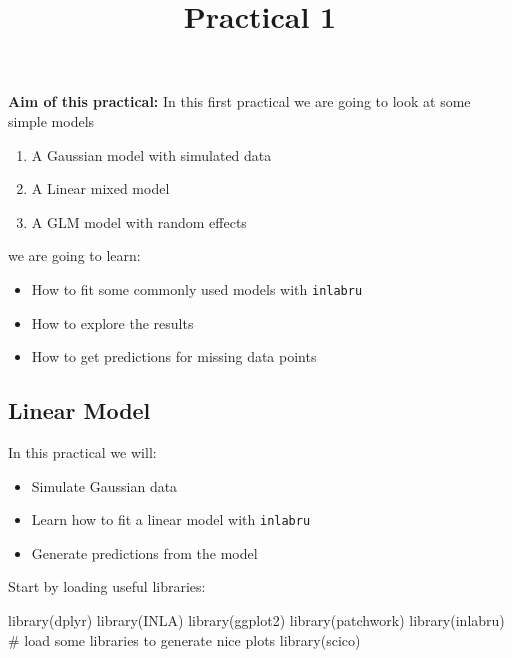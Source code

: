 \documentclass[
  letterpaper,
  DIV=11,
  numbers=noendperiod]{scrartcl}
\title{Practical 1}
\author{}
\date{}
\makeatletter
\newenvironment{Shaded}{\begin{snugshade}}{\end{snugshade}}
\newcommand{\CommentTok}[1]{\textcolor[rgb]{0.37,0.37,0.37}{#1}}
\newcommand{\FunctionTok}[1]{\textcolor[rgb]{0.28,0.35,0.67}{#1}}
\newcommand{\NormalTok}[1]{\textcolor[rgb]{0.00,0.23,0.31}{#1}}
\providecommand{\tightlist}{%
  \setlength{\itemsep}{0pt}\setlength{\parskip}{0pt}}\usepackage{longtable,booktabs,array}
\renewcommand{\maketitle}{\bgroup\setlength{\parindent}{0pt}
\begin{flushleft}
  {\sffamily\huge\textbf{\MakeUppercase{\@title}}} \vspace{0.3cm} \newline
  {\Large {\@subtitle}} \newline
  \@author
\end{flushleft}\egroup
}
\makeatother
\begin{document}
\maketitle

\pagestyle{mystyle}


\textbf{Aim of this practical:} In this first practical we are going to
look at some simple models

\begin{enumerate}
\def\labelenumi{\arabic{enumi}.}
\tightlist
\item
  A Gaussian model with simulated data
\item
  A Linear mixed model
\item
  A GLM model with random effects
\end{enumerate}

we are going to learn:

\begin{itemize}
\tightlist
\item
  How to fit some commonly used models with \texttt{inlabru}
\item
  How to explore the results
\item
  How to get predictions for missing data points
\end{itemize}

\subsection{Linear Model}\label{sec-linmodel}

In this practical we will:

\begin{itemize}
\tightlist
\item
  Simulate Gaussian data
\item
  Learn how to fit a linear model with \texttt{inlabru}
\item
  Generate predictions from the model
\end{itemize}

Start by loading useful libraries:

\begin{Shaded}
\begin{Highlighting}[]
\FunctionTok{library}\NormalTok{(dplyr)}
\FunctionTok{library}\NormalTok{(INLA)}
\FunctionTok{library}\NormalTok{(ggplot2)}
\FunctionTok{library}\NormalTok{(patchwork)}
\FunctionTok{library}\NormalTok{(inlabru)     }
\CommentTok{\# load some libraries to generate nice plots}
\FunctionTok{library}\NormalTok{(scico)}
\end{Highlighting}
\end{Shaded}
\end{document}
